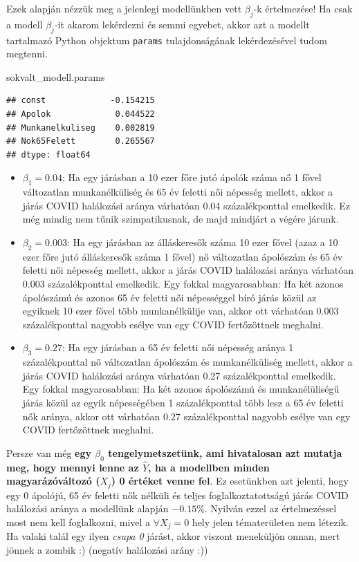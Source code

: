 \documentclass[
]{book}
\newenvironment{Shaded}{\begin{snugshade}}{\end{snugshade}}
\newcommand{\NormalTok}[1]{#1}
\providecommand{\tightlist}{%
  \setlength{\itemsep}{0pt}\setlength{\parskip}{0pt}}
\begin{document}
Ezek alapján nézzük meg a jelenlegi modellünkben vett \(\beta_j\)-k értelmezése! Ha csak a modell \(\beta_j\)-it akarom lekérdezni és semmi egyebet, akkor azt a modellt tartalmazó Python objektum \texttt{params} tulajdonságának lekérdezésével tudom megtenni.

\begin{Shaded}
\begin{Highlighting}[]
\NormalTok{sokvalt\_modell.params}
\end{Highlighting}
\end{Shaded}

\begin{verbatim}
## const             -0.154215
## Apolok             0.044522
## Munkanelkuliseg    0.002819
## Nok65Felett        0.265567
## dtype: float64
\end{verbatim}

\begin{itemize}
\tightlist
\item
  \(\beta_1=0.04\): Ha egy járásban a 10 ezer főre jutó ápolók száma nő 1 fővel változatlan munkanélküliség és 65 év feletti női népesség mellett, akkor a járás COVID halálozási aránya várhatóan 0.04 százalékponttal emelkedik. Ez még mindig nem tűnik szimpatikusnak, de majd mindjárt a végére járunk.
\item
  \(\beta_2=0.003\): Ha egy járásban az álláskeresők száma 10 ezer fővel (azaz a 10 ezer főre jutó álláskeresők száma 1 fővel) nő változatlan ápolószám és 65 év feletti női népesség mellett, akkor a járás COVID halálozási aránya várhatóan 0.003 százalékponttal emelkedik. Egy fokkal magyarosabban: Ha két azonos ápolószámú és azonos 65 év feletti női népességgel bíró járás közül az egyiknek 10 ezer fővel több munkanélkülije van, akkor ott várhatóan 0.003 százalékponttal nagyobb esélye van egy COVID fertőzöttnek meghalni.
\item
  \(\beta_3=0.27\): Ha egy járásban a 65 év feletti női népesség aránya 1 százalékponttal nő változatlan ápolószám és munkanélküliség mellett, akkor a járás COVID halálozási aránya várhatóan 0.27 százalékponttal emelkedik. Egy fokkal magyarosabban: Ha két azonos ápolószámú és munkanélüliségű járás közül az egyik népességében 1 százalékponttal több lesz a 65 év feletti nők aránya, akkor ott várhatóan 0.27 százalékponttal nagyobb esélye van egy COVID fertőzöttnek meghalni.
\end{itemize}

Persze van még \textbf{egy \(\beta_0\) tengelymetszetünk, ami hivatalosan azt mutatja meg, hogy mennyi lenne az \(\hat{Y}\), ha a modellben minden magyarázóváltozó (\(X_j\)) 0 értéket venne fel}.
Ez esetünkben azt jelenti, hogy egy 0 ápolójú, 65 év feletti nők nélküli és teljes foglalkoztatottságú járás COVID halálozási aránya a modellünk alapján \(-0.15\%\). Nyilván ezzel az értelmezéssel most nem kell foglalkozni, mivel a \(\forall X_j=0\) hely jelen tématerületen nem létezik. Ha valaki talál egy ilyen \emph{csupa 0} járást, akkor viszont meneküljön onnan, mert jönnek a zombik :) (negatív halálozási arány :))
\end{document}
